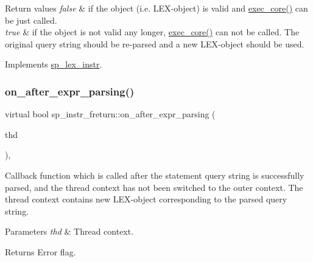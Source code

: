 \begin{DoxyRetVals}{Return values}
{\em false} & if the object (i.\+e. L\+EX-\/object) is valid and \mbox{\hyperlink{classsp__instr__freturn_a80fe2f90bc144b28a1a97dbff8b35e0b}{exec\+\_\+core()}} can be just called.\\
\hline
{\em true} & if the object is not valid any longer, \mbox{\hyperlink{classsp__instr__freturn_a80fe2f90bc144b28a1a97dbff8b35e0b}{exec\+\_\+core()}} can not be called. The original query string should be re-\/parsed and a new L\+EX-\/object should be used. \\
\hline
\end{DoxyRetVals}


Implements \mbox{\hyperlink{classsp__lex__instr_a56788cb475ccf94f224816006d9c90e9}{sp\+\_\+lex\+\_\+instr}}.

\mbox{\label{classsp__instr__freturn_aea65606ff061db0c9eb71b0aedecddfd}} 
\subsubsection{\texorpdfstring{on\+\_\+after\+\_\+expr\+\_\+parsing()}{on\_after\_expr\_parsing()}}
{\footnotesize\ttfamily virtual bool sp\+\_\+instr\+\_\+freturn\+::on\+\_\+after\+\_\+expr\+\_\+parsing (\begin{DoxyParamCaption}\item[{T\+HD $\ast$}]{thd }\end{DoxyParamCaption})\hspace{0.3cm}{\ttfamily [inline]}, {\ttfamily [virtual]}}

Callback function which is called after the statement query string is successfully parsed, and the thread context has not been switched to the outer context. The thread context contains new L\+EX-\/object corresponding to the parsed query string.


\begin{DoxyParams}{Parameters}
{\em thd} & Thread context.\\
\hline
\end{DoxyParams}
\begin{DoxyReturn}{Returns}
Error flag. 
\end{DoxyReturn}


